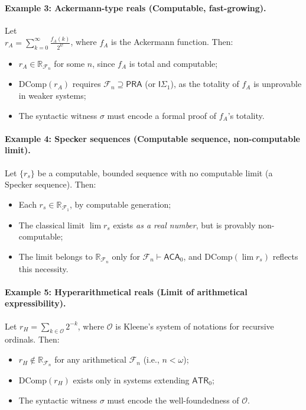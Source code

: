 \documentclass[12pt]{article}
\theoremstyle{definition}
\theoremstyle{plain}
\theoremstyle{remark}
\begin{document}
\paragraph{Example 3: Ackermann-type reals (Computable, fast-growing).}
Let \\\( r_A = \sum_{k=0}^\infty \frac{f_A(k)}{2^{k!}} \), where \( f_A \) is the Ackermann function. Then:
\begin{itemize}
    \item \( r_A \in \mathbb{R}_{\mathcal{F}_n} \) for some \( n \), since \( f_A \) is total and computable;
    \item \( \mathrm{DComp}(r_A) \) requires \( \mathcal{F}_n \supseteq \mathsf{PRA} \) (or \( \mathsf{I\Sigma}_1 \)), as the totality of \( f_A \) is unprovable in weaker systems;
    \item The syntactic witness \( \sigma \) must encode a formal proof of \( f_A \)'s totality.
\end{itemize}

\paragraph{Example 4: Specker sequences (Computable sequence, non-computable limit).}
Let \( \{ r_s \} \) be a computable, bounded sequence with no computable limit (a Specker sequence). Then:
\begin{itemize}
    \item Each \( r_s \in \mathbb{R}_{\mathcal{F}_1} \), by computable generation;
    \item The classical limit \( \lim r_s \) exists \emph{as a real number}, but is provably non-computable;
    \item The limit belongs to \( \mathbb{R}_{\mathcal{F}_n} \) only for \( \mathcal{F}_n \vdash \mathsf{ACA}_0 \), and \( \mathrm{DComp}(\lim r_s) \) reflects this necessity.
\end{itemize}

\paragraph{Example 5: Hyperarithmetical reals (Limit of arithmetical expressibility).}
Let \( r_H = \sum_{k \in \mathcal{O}} 2^{-k} \), where \( \mathcal{O} \) is Kleene’s system of notations for recursive ordinals. Then:
\begin{itemize}
    \item \( r_H \notin \mathbb{R}_{\mathcal{F}_n} \) for any arithmetical \( \mathcal{F}_n \) (i.e., \( n < \omega \));
    \item \( \mathrm{DComp}(r_H) \) exists only in systems extending \( \mathsf{ATR}_0 \);
    \item The syntactic witness \( \sigma \) must encode the well-foundedness of \( \mathcal{O} \).
\end{itemize}
\end{document}
